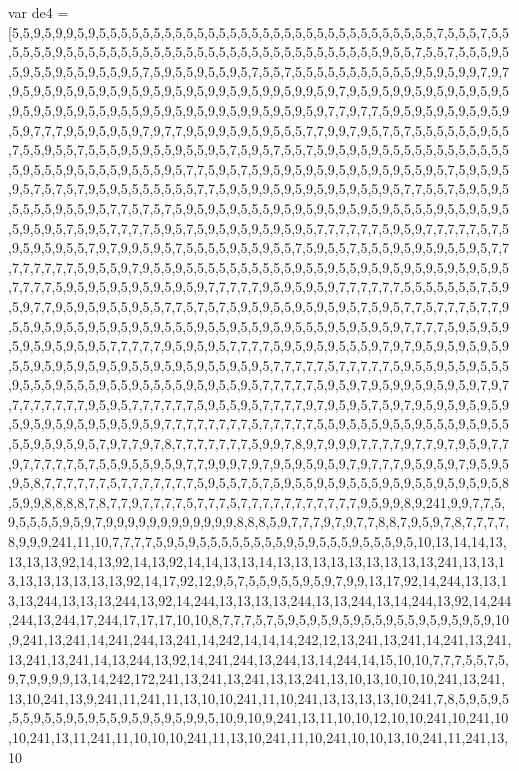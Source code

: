 var de4 = [5,5,9,5,9,9,5,9,5,5,5,5,5,5,5,5,5,5,5,5,5,5,5,5,5,5,5,5,5,5,5,5,5,5,5,5,5,5,5,7,5,5,5,7,5,5,5,5,5,5,9,5,5,5,5,5,5,5,5,5,5,5,5,5,5,5,5,5,5,5,5,5,5,5,5,5,5,5,5,5,9,5,5,7,5,5,7,5,5,5,9,5,5,9,5,5,9,5,5,9,5,5,9,5,7,5,9,5,5,9,5,5,9,5,7,5,5,7,5,5,5,5,5,5,5,5,5,5,5,9,5,9,5,9,9,7,9,7,9,5,9,5,9,5,9,5,9,5,9,5,9,5,9,5,9,5,9,9,5,9,5,9,9,5,9,9,5,9,7,9,5,9,5,9,9,5,9,5,9,5,9,5,9,5,9,5,9,5,9,5,9,5,5,9,5,5,9,5,9,5,9,5,9,9,5,9,9,5,9,5,9,5,9,7,7,9,7,7,5,9,5,9,5,9,5,9,5,9,5,9,5,9,7,7,7,9,5,9,5,9,5,9,7,9,7,7,9,5,9,9,5,9,5,9,5,5,5,7,7,9,9,7,9,5,7,5,7,5,5,5,5,5,5,9,5,5,7,5,5,9,5,5,7,5,5,5,9,5,9,5,5,9,5,5,9,5,7,5,9,5,7,5,5,7,5,9,5,9,5,9,5,5,5,5,5,5,5,5,5,5,5,5,5,9,5,5,5,9,5,5,5,5,9,5,5,5,9,5,7,7,5,9,5,7,5,9,5,9,5,9,5,9,5,9,5,9,5,9,5,5,9,5,7,5,9,5,9,5,9,5,7,5,7,5,7,9,5,9,5,5,5,5,5,5,5,7,7,5,9,5,9,9,5,9,5,9,5,9,5,9,5,5,9,5,7,7,5,5,7,5,9,5,9,5,5,5,5,5,9,5,5,9,5,7,7,5,7,5,7,5,9,5,9,5,9,5,5,5,9,5,9,5,9,5,9,5,9,5,9,5,5,5,5,9,5,5,9,5,9,5,5,9,5,9,5,7,5,9,5,7,7,7,7,5,9,5,7,5,9,5,9,5,9,5,9,5,9,5,7,7,7,7,7,7,5,9,5,9,7,7,7,7,7,5,7,5,9,5,9,5,9,5,5,7,9,7,9,9,5,9,5,7,5,5,5,5,9,5,5,9,5,5,7,5,9,5,5,7,5,5,5,9,5,9,5,9,5,5,9,5,7,7,7,7,7,7,7,7,5,9,5,5,9,7,9,5,5,9,5,5,5,5,5,5,5,5,5,5,9,5,5,9,5,5,9,5,9,5,9,5,9,5,9,5,9,5,9,5,7,7,7,7,5,9,5,9,5,9,5,9,5,9,5,9,5,9,7,7,7,7,7,9,5,9,5,9,5,9,7,7,7,7,7,7,5,5,5,5,5,5,5,7,5,9,5,9,7,7,9,5,9,5,9,5,5,9,5,5,7,7,5,7,5,7,5,9,5,9,5,5,9,5,9,5,9,5,7,5,9,5,7,7,5,7,7,7,5,7,7,9,5,5,9,5,9,5,5,9,5,9,5,9,5,9,5,5,5,9,5,5,9,5,5,9,5,9,5,5,5,9,5,9,5,9,5,9,7,7,7,7,5,9,5,9,5,9,5,9,5,9,5,9,5,9,5,7,7,7,7,7,9,5,9,5,9,5,7,7,7,7,5,9,5,9,5,9,5,5,5,9,7,9,7,9,5,9,5,9,5,9,5,9,5,5,9,5,9,5,9,5,9,5,9,5,5,9,5,9,5,9,5,5,9,5,9,5,7,7,7,7,7,5,7,7,7,7,7,5,9,5,5,9,5,5,9,5,5,5,9,5,5,5,9,5,5,5,9,5,5,9,5,5,5,5,9,5,9,5,5,9,5,7,7,7,7,7,5,9,5,9,7,9,5,9,9,5,9,5,9,5,9,7,9,7,7,7,7,7,7,7,7,9,5,9,5,7,7,7,7,7,7,5,9,5,5,9,5,7,7,7,7,9,7,9,5,9,5,7,5,9,7,9,5,9,5,9,5,9,5,9,5,9,5,9,5,9,5,9,5,9,5,9,5,9,7,7,7,7,7,7,7,7,5,7,7,7,7,7,5,5,9,5,5,5,9,5,5,9,5,5,5,9,5,9,5,5,5,5,9,5,9,5,9,5,7,9,7,7,9,7,8,7,7,7,7,7,7,7,5,9,9,7,8,9,7,9,9,9,7,7,7,7,9,7,7,9,7,9,5,9,7,7,9,7,7,7,7,7,5,7,5,5,9,5,5,9,5,9,7,7,9,9,9,7,9,7,9,5,9,5,9,5,9,7,9,7,7,7,9,5,9,5,9,7,9,5,9,5,9,5,8,7,7,7,7,7,7,5,7,7,7,7,7,7,7,5,9,5,5,7,5,7,5,9,5,5,9,5,9,5,5,5,9,5,9,5,5,9,5,9,5,9,5,8,5,9,9,8,8,8,8,7,8,7,7,9,7,7,7,7,5,7,7,7,5,7,7,7,7,7,7,7,7,7,7,7,9,5,9,9,8,9,241,9,9,7,7,5,9,5,5,5,5,9,5,9,7,9,9,9,9,9,9,9,9,9,9,9,9,8,8,8,5,9,7,7,7,9,7,9,7,7,8,8,7,9,5,9,7,8,7,7,7,7,8,9,9,9,241,11,10,7,7,7,7,5,9,5,9,5,5,5,5,5,5,5,5,9,5,9,5,5,5,9,5,5,5,9,5,10,13,14,14,13,13,13,13,92,14,13,92,14,13,92,14,14,13,13,14,13,13,13,13,13,13,13,13,13,241,13,13,13,13,13,13,13,13,13,92,14,17,92,12,9,5,7,5,5,9,5,5,9,5,9,7,9,9,13,17,92,14,244,13,13,13,13,244,13,13,13,244,13,92,14,244,13,13,13,13,244,13,13,244,13,14,244,13,92,14,244,244,13,244,17,244,17,17,17,10,10,8,7,7,7,5,7,5,9,5,9,5,9,5,9,5,5,9,5,5,9,5,9,5,9,5,9,10,9,241,13,241,14,241,244,13,241,14,242,14,14,14,242,12,13,241,13,241,14,241,13,241,13,241,13,241,14,13,244,13,92,14,241,244,13,244,13,14,244,14,15,10,10,7,7,7,5,5,7,5,9,7,9,9,9,9,13,14,242,172,241,13,241,13,241,13,13,241,13,10,13,10,10,10,241,13,241,13,10,241,13,9,241,11,241,11,13,10,10,241,11,10,241,13,13,13,13,10,241,7,8,5,9,5,9,5,5,5,9,5,5,9,5,9,5,5,9,5,9,5,9,5,9,9,5,10,9,10,9,241,13,11,10,10,12,10,10,241,10,241,10,10,241,13,11,241,11,10,10,10,241,11,13,10,241,11,10,241,10,10,13,10,241,11,241,13,10